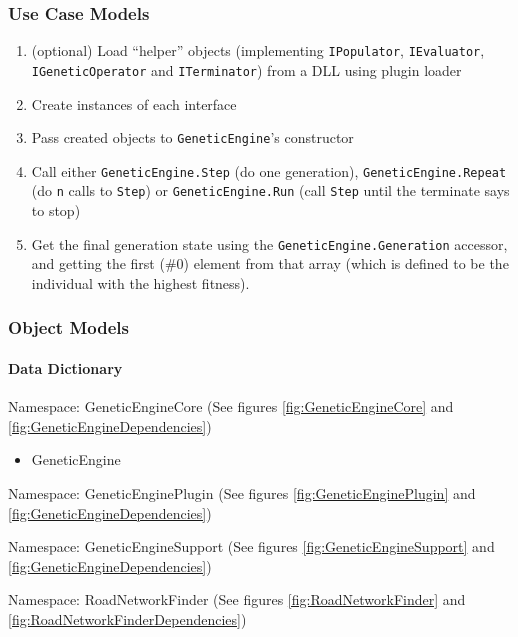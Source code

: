\subsubsection{Use Case Models}
% 
\begin{enumerate}
 \item (optional) Load ``helper'' objects (implementing \texttt{IPopulator}, \texttt{IEvaluator}, \texttt{IGeneticOperator} and \texttt{ITerminator}) from a DLL using plugin loader
 \item Create instances of each interface
 \item Pass created objects to \texttt{GeneticEngine}'s constructor
 \item Call either \texttt{GeneticEngine.Step} (do one generation), \texttt{GeneticEngine.Repeat} (do \texttt{n} calls to \texttt{Step}) or \texttt{GeneticEngine.Run} (call \texttt{Step} until the terminate says to stop) 
 \item Get the final generation state using the \texttt{GeneticEngine.Generation} accessor, and getting the first (\#0) element from that array (which is defined to be the individual with the highest fitness).
\end{enumerate}

\subsubsection{Object Models}
\paragraph{Data Dictionary}

Namespace: GeneticEngineCore (See figures \ref{fig:GeneticEngineCore} and \ref{fig:GeneticEngineDependencies})
\begin{itemize}
\item GeneticEngine
\end{itemize}

Namespace: GeneticEnginePlugin (See figures \ref{fig:GeneticEnginePlugin} and \ref{fig:GeneticEngineDependencies})

Namespace: GeneticEngineSupport (See figures \ref{fig:GeneticEngineSupport} and \ref{fig:GeneticEngineDependencies})

Namespace: RoadNetworkFinder (See figures \ref{fig:RoadNetworkFinder} and \ref{fig:RoadNetworkFinderDependencies})

